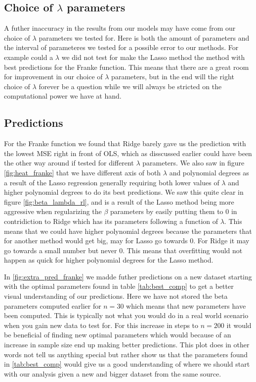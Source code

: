 \documentclass[12pt]{article}
\begin{document}
\subsection{Choice of $\lambda$ parameters}
A futher inaccuracy in the results from our models may have come from our choice of $\lambda$ parameters we tested for. Here is both the amount of parameters and the interval of parameteres we tested for a possible error to our methods. For example could a $\lambda$ we did not test for make the Lasso method the method with best predictions for the Franke function. This means that there are a great room for improvement in our choice of $\lambda$ parameters, but in the end will the right choice of $\lambda$ forever be a question while we will always be stricted on the computational power we have at hand.

\subsection{Predictions}
For the Franke function we found that Ridge barely gave us the prediction with the lowest MSE right in front of OLS, which as disscussed earlier could have been the other way around if tested for different $\lambda$ parameters. We also saw in figure \ref{fig:heat_franke} that we have different axis of both $\lambda$ and polynomial degrees as a result of the Lasso regression generally requiring both lower values of $\lambda$ and higher polynomial degrees to do its best predictions. We saw this quite clear in figure \ref{fig:beta_lambda_rl}, and is a result of the Lasso method being more aggressive when regularizing the $\beta$ parameters by easily putting them to 0 in contridiction to Ridge which has its parameters following a function of $\lambda$. This means that we could have higher polynomial degrees because the parameters that for another method would get big, may for Lasso go towards 0. For Ridge it may go towards a small number but never 0. This means that overfitting would not happen as quick for higher polynomial degrees for the Lasso method.

In \ref{fig:extra_pred_franke} we madde futher predictions on a new dataset starting with the optimal parameters found in table \ref{tab:best_comp} to get a better visual understanding of our predictions. Here we have not stored the beta parameters computed earlier for $n=30$ which means that new parameters have been computed. This is typically not what you would do in a real world scenario when you gain new data to test for. For this increase in steps to $n=200$ it would be beneficial of finding new optimal parameters which would because of an increase in sample size end up making better predictions. This plot does in other words not tell us anything special but rather show us that the parameters found in \ref{tab:best_comp} would give us a good understanding of where we should start with our analysis given a new and bigger dataset from the same source.
\end{document}
